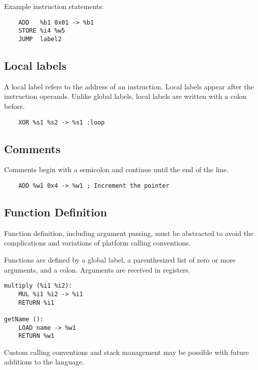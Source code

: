 Example instruction statements:

\begin{verbatim}
    ADD   %b1 0x01 -> %b1
    STORE %i4 %w5
    JUMP  label2
\end{verbatim}

\subsection{Local labels}

A local label refers to the address of an instruction. Local labels
appear after the instruction operands. Unlike global
labels, local labels are written with a colon before.

\begin{verbatim}
    XOR %s1 %s2 -> %s1 :loop
\end{verbatim}

\subsection{Comments}

Comments begin with a semicolon and continue until the end of the line.

\begin{verbatim}
    ADD %w1 0x4 -> %w1 ; Increment the pointer
\end{verbatim}

\subsection{Function Definition}

Function definition, including argument passing, must be abstracted to avoid
the complications and variations of platform calling conventions.

Functions are defined by a global label, a parenthesized list of zero
or more arguments, and a colon. Arguments are received in registers.

\begin{verbatim}
multiply (%i1 %i2):
    MUL %i1 %i2 -> %i1
    RETURN %i1

getName ():
    LOAD name -> %w1
    RETURN %w1
\end{verbatim}

Custom calling conventions and stack management may
be possible with future additions to the language.
